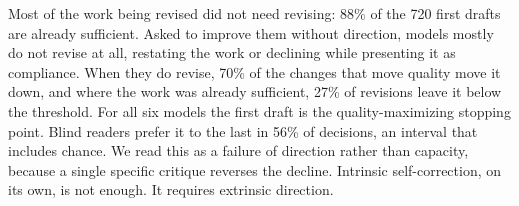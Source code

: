 Most of the work being revised did not need revising: 88\% of the 720 first drafts are
already sufficient. Asked to improve them without direction, models mostly do not revise
at all, restating the work or declining while presenting it as compliance. When they do
revise, 70\% of the changes that move quality move it down, and where the work was already
sufficient, 27\% of revisions leave it below the threshold. For all six models the first
draft is the quality-maximizing stopping point. Blind readers prefer it to the last in
56\% of decisions, an interval that includes chance. We read this as a failure of
direction rather than capacity, because a single specific critique reverses the decline.
Intrinsic self-correction, on its own, is not enough. It requires extrinsic direction.
